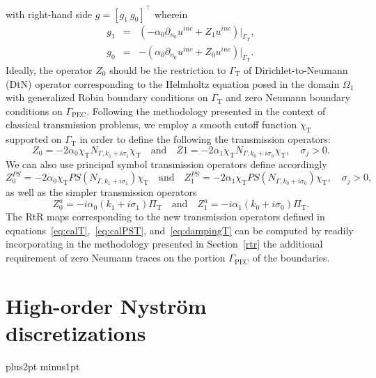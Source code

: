 \documentclass[11pt]{article}
\numberwithin{equation}{section}
\newcommand{\PEC}{\mathrm{PEC}}
\newcommand{\TR}{\mathrm{T}}
\begin{document}
with right-hand side $g=[g_1\ g_0]^\top$ wherein
 \begin{eqnarray}\label{rhs_ddm}
   g_1&=& (-\alpha_0\partial_{n_0}u^{inc}+Z_1u^{inc})|_{\Gamma_\TR},\nonumber\\
   g_0&=&-(\alpha_0\partial_{n_0}u^{inc}+Z_0u^{inc})|_{\Gamma_\TR}.\nonumber
   \end{eqnarray}
Ideally, the operator $Z_0$ should be the restriction to $\Gamma_\TR$ of Dirichlet-to-Neumann (DtN) operator corresponding to the Helmholtz equation posed in the domain $\Omega_1$ with generalized Robin boundary conditions on $\Gamma_\TR$ and zero Neumann boundary conditions on $\Gamma_{\PEC}$. Following the methodology presented in the context of classical transmission problems, we employ a smooth cutoff function $\chi_\TR$ supported on $\Gamma_\TR$ in order to define the following the transmission operators:
 \begin{equation}\label{eq:calT}
 Z_0=-2\alpha_0\chi_{\TR}N_{\Gamma,k_1+i\sigma_1}\chi_{\TR}\quad\mbox{and}\quad Z1 = -2\alpha_1\chi_{\TR}N_{\Gamma,k_0+i\sigma_0}\chi_{\TR},\quad \sigma_j>0.
 \end{equation}
We can also use principal symbol transmission operators define accordingly
 \begin{equation}\label{eq:calPST}
 Z_0^{PS}=-2\alpha_0\chi_{\TR}PS(N_{\Gamma,k_1+i\sigma_1})\chi_{\TR}\quad\mbox{and}\quad Z_1^{PS} = -2\alpha_1\chi_{\TR}PS(N_{\Gamma,k_0+i\sigma_0})\chi_{\TR},\quad \sigma_j>0,
 \end{equation}
 as well as the simpler transmission operators 
 \begin{equation}\label{eq:dampingT}
   Z_0^a=-i\alpha_0(k_1+i\sigma_1)\Pi_\TR\quad\mbox{and}\quad Z_1^a=-i\alpha_1(k_0+i\sigma_0)\Pi_\TR.
 \end{equation}
 The RtR maps corresponding to the new transmission operators defined in equations~\eqref{eq:calT},~\eqref{eq:calPST}, and~\eqref{eq:dampingT} can be computed by readily incorporating in the methodology presented in Section~\ref{rtr} the additional requirement of zero Neumann traces on the portion $\Gamma_{\PEC}$ of the boundaries. 

\section{High-order Nystr\"om discretizations~\label{Nystrom}}

\parskip 10pt plus2pt minus1pt
\parindent0pt 
\end{document}
